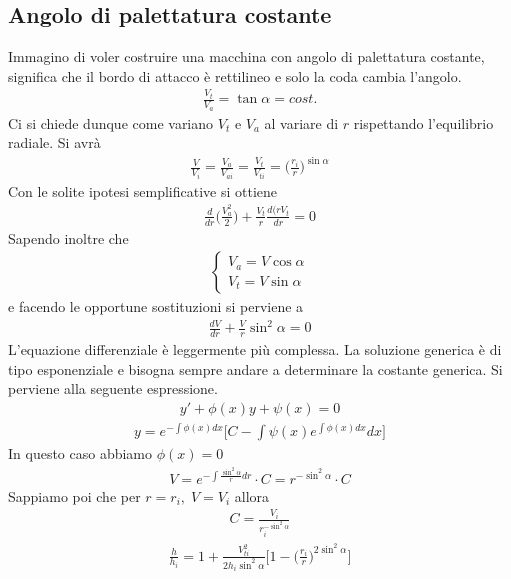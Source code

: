 \subsection{Angolo di palettatura costante}
Immagino di voler costruire una macchina con angolo di palettatura costante, significa che il bordo di attacco è rettilineo e solo la coda cambia l'angolo.
\begin{align*}
\frac{V_t}{V_a} = \tan \alpha = cost.
\end{align*}
Ci si chiede dunque come variano $V_t$ e $V_a$ al variare di $r$ rispettando l'equilibrio radiale.
Si avrà
\begin{align*}
\frac{V}{V_i} = \frac{V_a}{V_{ai}} = \frac{V_t}{V_{ti}} = \bigg(\frac{r_i}{r} \bigg)^{\sin \alpha}
\end{align*}
Con le solite ipotesi semplificative si ottiene
\begin{align*}
\frac{d}{dr} \bigg(\frac{V_a^2}{2} \bigg) + \frac{V_t}{r} \frac{d(rV_t}{dr} = 0
\end{align*}
Sapendo inoltre che
\begin{align*}
\begin{cases}
V_a = V \cos \alpha\\
V_t = V \sin \alpha
\end{cases}
\end{align*}
e facendo le opportune sostituzioni si perviene a
\begin{align*}
\boxed{\frac{dV}{dr} + \frac{V}{r} \sin^2 \alpha = 0}
\end{align*}
L'equazione differenziale è leggermente più complessa. La soluzione generica è di tipo esponenziale e bisogna sempre andare a determinare la costante generica. Si perviene alla seguente espressione.
\begin{align*}
y' + \phi(x)y + \psi(x) = 0 
\end{align*}
\begin{align*}
y = e^{-\int \phi(x)dx} \bigg[ C- \int \psi(x) e^{\int \phi(x)dx} dx \bigg] 
\end{align*}
In questo caso abbiamo $\phi(x) = 0$
\begin{align*}
V = e^{-\int \frac{\sin^2 \alpha}{r}dr}\cdot C = r^{-\sin^2 \alpha} \cdot C
\end{align*}
Sappiamo poi che per $r=r_i,\; V=V_i$ allora
\begin{align*}
C = \frac{V_i}{r_i^{-\sin^2 \alpha}}
\end{align*}
\begin{align*}
\boxed{ \frac{h}{h_i} =  1+ \frac{V_{ti}^2}{2 h_i \sin^2 \alpha} \bigg[1- \bigg(\frac{r_i}{r} \bigg) ^{2 \sin^2 \alpha} \bigg]}
\end{align*}
